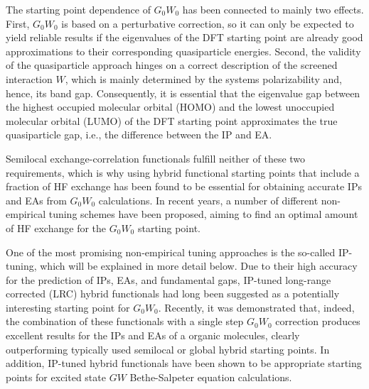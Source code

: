 \documentclass[journal=jctcce,manuscript=article,layout=twocolumn]{achemso}
\begin{document}
The starting point dependence of $G_0W_0$ has been connected to mainly two effects. First, $G_0W_0$ is based on a perturbative correction, so it can only be expected to yield reliable results if the eigenvalues of the DFT starting point are already good approximations to their corresponding quasiparticle energies. Second, the validity of the quasiparticle approach hinges on a correct description of the screened interaction $W$, which is mainly determined by the systems polarizability and, hence, its band gap. Consequently, it is essential that the eigenvalue gap between the highest occupied molecular orbital (HOMO) and the lowest unoccupied molecular orbital (LUMO) of the DFT starting point approximates the true quasiparticle gap, i.e., the difference between the IP and EA.\cite{j_phys_2017_GW_organic_semi} 

Semilocal exchange-correlation functionals fulfill neither of these two requirements, which is why using hybrid functional starting points that include a fraction of HF exchange has been found to be essential for obtaining accurate IPs and EAs from $G_0W_0$ calculations.\cite{PhysRevB.76.115109, PhysRevB.86.041110, jctc_2016_IP_III_GW_stuff, phys_rev_b_2012_gw_hierachy_results,  GW100, GW100_planewave, GW100_scGW, gallandi_koerzd_lrc_g0w0_2015, GW_acenes} In recent years, a number of different non-empirical tuning schemes have been proposed, aiming to find an optimal amount of HF exchange for the $G_0W_0$ starting point. 


One of the most promising non-empirical tuning approaches is the so-called IP-tuning,
\cite{IPtuning_JACS2009,jcp_2009_ct_excit_tuning, ann_rev_phys_chem_2010_tuning_RSH, pccp_2009_tuning_proc_paper}
which will be explained in more detail below. Due to their high accuracy for the prediction of IPs, EAs, and fundamental gaps, IP-tuned long-range corrected (LRC) hybrid functionals had long been suggested as a potentially interesting starting point for $G_0W_0$.\cite{PhysRevLett.109.226405} Recently, it was demonstrated that, indeed, the combination of these functionals with a single step $G_0W_0$ correction produces excellent results for the IPs and EAs of a organic molecules, clearly outperforming typically used semilocal or global hybrid starting points.\cite{gallandi_koerzd_lrc_g0w0_2015,jctc_2016_IP_II_lrc_funct_GW,jctc_2016_IP_III_GW_stuff, GW_acenes} In addition, IP-tuned hybrid functionals have been shown to be appropriate starting points for excited state $GW$ Bethe-Salpeter equation calculations.\cite{JChemPhys.146.194108}
\end{document}
